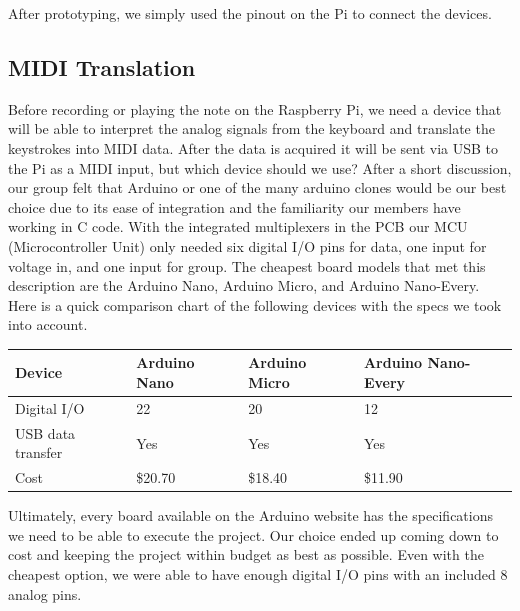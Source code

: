 After prototyping, we simply used the pinout on the Pi to connect the devices.

\subsection{MIDI Translation}
Before recording or playing the note on the Raspberry Pi, we need a device that will be able to interpret the analog signals from the keyboard and translate the keystrokes into MIDI data. After the data is acquired it will be sent via USB to the Pi as a MIDI input, but which device should we use? After a short discussion, our group felt that Arduino or one of the many arduino clones would be our best choice due to its ease of integration and the familiarity our members have working in C code. With the integrated multiplexers in the PCB our MCU (Microcontroller Unit) only needed six digital I/O pins for data, one input for voltage in, and one input for group. The cheapest board models that met this description are the Arduino Nano, Arduino Micro, and Arduino Nano-Every. Here is a quick comparison chart of the following devices with the specs we took into account.

\begin{table}[]
\centering
\begin{tabular}{|l|l|l|l|}
\hline
Device            & Arduino Nano & Arduino Micro & Arduino Nano-Every \\ \hline
Digital I/O       & 22           & 20            & 12                 \\ \hline
USB data transfer & Yes          & Yes           & Yes                \\ \hline
Cost              & \$20.70      & \$18.40       & \$11.90            \\ \hline
\end{tabular}
\end{table}

Ultimately, every board available on the Arduino website has the specifications we need to be able to execute the project. Our choice ended up coming down to cost and keeping the project within budget as best as possible. Even with the cheapest option, we were able to have enough digital I/O pins with an included 8 analog pins.

